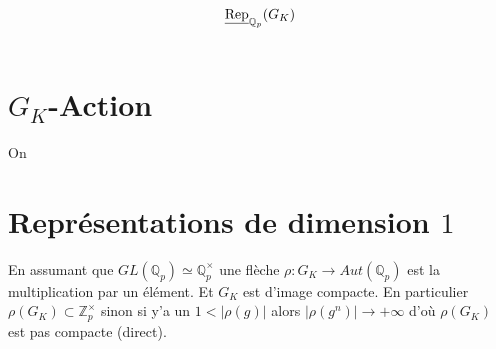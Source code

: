 \documentclass[a4paper,12pt]{article}
\title{$\Repp$}
\date{}
\newcommand{\Z}{\mathbb{Z}}
\newcommand{\Q}{\mathbb{Q}}
\theoremstyle{plain}
\theoremstyle{definition}
\theoremstyle{remark}
\begin{document}
\maketitle
\section{$G_K$-Action}
On 

\section{Représentations de dimension $1$}
En assumant que $GL(\Q_p)\simeq \Q_p^\times$ une flèche
$\rho\colon G_K\to Aut(\Q_p)$ est la multiplication par
un élément. Et $G_K$ est d'image compacte. En particulier
$\rho(G_K)\subset \Z_p^\times$ sinon si y'a un 
$1<|\rho(g)|$ alors $|\rho(g^n)|\to +\infty$ d'où 
$\rho(G_K)$ est pas compacte (direct).
\end{document}
